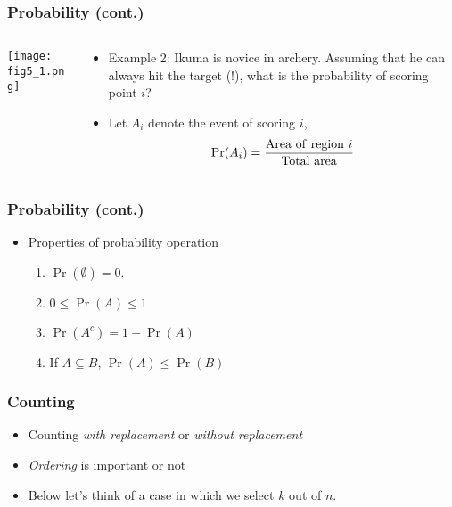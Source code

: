 \documentclass[pdflatex, 12pt]{beamer}
\begin{document}
\begin{frame}
\frametitle{Probability (cont.)}
\begin{columns}
\begin{column}{0.5\textwidth}
\centering
\texttt{[image: fig5\_1.png]}
\end{column}
\begin{column}{0.5\textwidth}
\begin{itemize}
\item Example 2: Ikuma is novice in archery. Assuming that he can always hit the target (!), what is the probability of scoring point $i$?
\vspace{0.4cm}
\item Let $A_i$ denote the event of scoring $i$, 
 \begin{equation}
 \Pr(A_i) = \frac{\mathrm{Area \ of \ region\ }i}{\mathrm{Total \ area}} \notag
 \end{equation}
\end{itemize}
\end{column}
\end{columns}
\end{frame}

\begin{frame}
\frametitle{Probability (cont.)}
\begin{itemize}
\item Properties of probability operation
 \begin{enumerate}
 \item $\Pr(\emptyset) = 0.$
 \item $0 \leq \Pr(A) \leq 1$
 \item $\Pr(A^c) = 1 - \Pr(A)$
 \item If $A \subseteq B$, $\Pr(A) \leq \Pr(B)$
 \end{enumerate}
\end{itemize}
\end{frame}

\begin{frame}
\frametitle{Counting}
\begin{itemize}
\item Counting \textit{with replacement} or \textit{without replacement}
\vspace{0.4cm}
\item \textit{Ordering} is important or not
\vspace{0.4cm}
\item Below let's think of a case in which we select $k$ out of $n$.
\end{itemize}
\end{frame}
\end{document}

